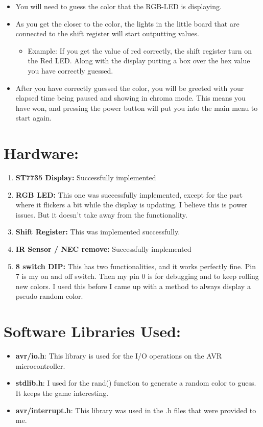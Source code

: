 \documentclass[12pt]{article}
\begin{document}
\begin{itemize}
\pagebreak
  \item You will need to guess the color that the RGB-LED is displaying.
  \item As you get the closer to the color, the lights in the little board
    that are connected to the shift register will start outputting values.
    \begin{itemize}
      \item Example: If you get the value of red correctly,
        the shift register turn on the Red LED.
        Along with the display putting a box over the hex value you have correctly guessed.
    \end{itemize}
  \item After you have correctly guessed the color, you will be greeted with your
    elapsed time being paused and showing in chroma mode.
    This means you have won, and pressing
    the power button will put you into the main menu to start again.
\end{itemize}

\pagebreak
\section{Hardware:}
\begin{enumerate}
  \item \textbf{ST7735 Display:}
    Successfully implemented
  \item \textbf{RGB LED:}
    This one was successfully implemented, except for the part
    where it flickers a bit while the display is updating.
    I believe this is power issues. But it doesn't take away
    from the functionality.
  \item \textbf{Shift Register:} This was implemented successfully.
  \item \textbf{IR Sensor / NEC remove:}
    Successfully implemented
  \item \textbf{8 switch DIP:}
    This has two functionalities, and it works perfectly fine. Pin 7 is my on and off switch.
    Then my pin 0 is for debugging and to keep rolling new colors. I used this before I came up
    with a method to always display a pseudo random color.
\end{enumerate}

\pagebreak




\pagebreak
\section{Software Libraries Used:}
\begin{itemize}
  \item \textbf{avr/io.h}:
    This library is used for the I/O operations on the AVR microcontroller.
  \item \textbf{stdlib.h}:
    I used for the rand() function to generate a random color to guess.
    It keeps the game interesting.
  \item \textbf{avr/interrupt.h}:
    This library was used in the .h files that were provided to me.
\end{itemize}
\end{document}
